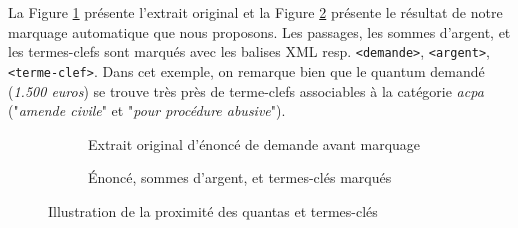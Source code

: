  La Figure \ref{fig:quanta:exemple-proximite-original} présente l'extrait original et la Figure \ref{fig:quanta:exemple-proximite-marquage} présente le résultat de notre marquage automatique que nous proposons. Les passages, les sommes d'argent, et les termes-clefs sont marqués avec les balises XML resp. \verb=<demande>=, \verb=<argent>=, \verb=<terme-clef>=. Dans cet exemple, on remarque bien que le quantum demandé (\textit{1.500 euros}) se trouve très près de terme-clefs associables à la catégorie \textit{acpa} ("\textit{amende civile}" et "\textit{pour procédure abusive}"). 

\begin{figure}[!htb]
	\scriptsize
	\centering
	\begin{subfigure}[t]{0.95\textwidth}
		\caption{Extrait original d'énoncé de demande avant marquage}\label{fig:quanta:exemple-proximite-original}
	\end{subfigure} 
	
	
	\begin{subfigure}[t]{0.95\textwidth}
		\caption{Énoncé, sommes d'argent, et termes-clés marqués}\label{fig:quanta:exemple-proximite-marquage}
	\end{subfigure}
	\caption{Illustration de la proximité des quantas et termes-clés}
	\label{fig:quanta:exemple-proximite}
\end{figure}

